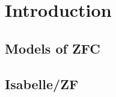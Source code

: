 \section{Introduction}\label{sec:introduction}

\subsection{Models of ZFC}

\subsection{Isabelle/ZF}


